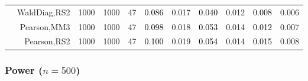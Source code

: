 \documentclass[
]{article}
\begin{document}
\begin{table}[H]
{\begin{tabular}[t]{lrrrrrrrlrr}
\hspace{1em} & WaldDiag,RS2 & 1000 & 1000 & 47 & \textcolor{black}{0.086} & 0.017 & \textcolor{black}{0.040} & 0.012 & \textcolor{black}{0.008} & 0.006\\

\hspace{1em} & Pearson,MM3 & 1000 & 1000 & 47 & \textcolor{black}{0.098} & 0.018 & \textcolor{black}{0.053} & 0.014 & \textcolor{black}{0.012} & 0.007\\

\hspace{1em} & Pearson,RS2 & 1000 & 1000 & 47 & \textcolor{black}{0.100} & 0.019 & \textcolor{black}{0.054} & 0.014 & \textcolor{black}{0.015} & 0.008\\
\bottomrule
\end{tabular}}
\endgroup{}
\end{table}

\hypertarget{power-n500}{%
\subsubsection{\texorpdfstring{Power
(\(n=500\))}{Power (n=500)}}\label{power-n500}}
\end{document}
